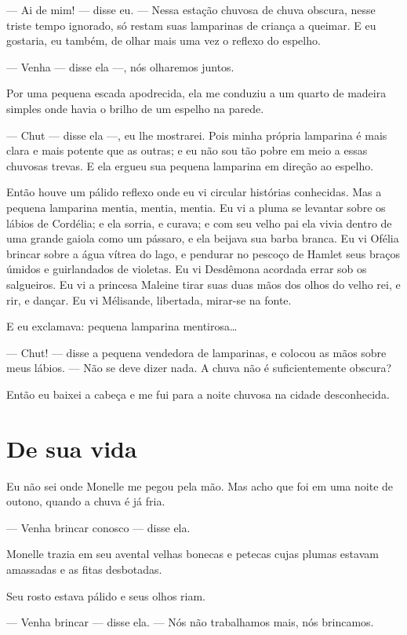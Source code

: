 --- Ai de mim! --- disse eu. --- Nessa estação chuvosa de chuva obscura, nesse
triste tempo ignorado, só restam suas lamparinas de criança a queimar. E eu
gostaria, eu também, de olhar mais uma vez o reflexo do espelho.

--- Venha --- disse ela ---, nós olharemos juntos.

Por uma pequena escada apodrecida, ela me \mbox{conduziu} a um quarto de
madeira simples onde havia o brilho de um espelho na parede.

--- Chut --- disse ela ---, eu lhe mostrarei. Pois minha própria lamparina é
mais clara e mais potente que as outras; e eu não sou tão pobre em meio a
essas chuvosas trevas. E ela ergueu sua pequena lamparina em direção ao
espelho.

Então houve um pálido reflexo onde eu vi circular histórias conhecidas.
Mas a pequena lamparina mentia, mentia, mentia. Eu vi a pluma se levantar
sobre os lábios de Cordélia; e ela sorria, e curava; e com seu velho pai
ela vivia dentro de uma grande gaiola como um pássaro, e ela beijava sua
barba branca. Eu vi Ofélia brincar sobre a água vítrea do lago, e pendurar
no pescoço de Hamlet seus braços úmidos e guirlandados de violetas. Eu vi
Desdêmona acordada errar sob os salgueiros. Eu vi a princesa Maleine tirar
suas duas mãos dos olhos do velho rei, e rir, e dançar. Eu vi Mélisande,
libertada, mirar-se na fonte.

E eu exclamava: pequena lamparina mentirosa\ldots{}

--- Chut! --- disse a pequena vendedora de lamparinas, e colocou as mãos
sobre meus lábios.  --- Não se deve dizer nada. A chuva não é suficientemente
obscura?

Então eu baixei a cabeça e me fui para a noite chuvosa na cidade
desconhecida.

\section{De sua vida}

Eu não sei onde Monelle me pegou pela mão. Mas acho que foi em uma
noite de outono, quando a chuva é já fria.

--- Venha brincar conosco --- disse ela.

Monelle trazia em seu avental velhas bonecas e petecas cujas plumas
estavam amassadas e as fitas desbotadas.

Seu rosto estava pálido e seus olhos riam.

--- Venha brincar --- disse ela.  --- Nós não trabalhamos mais, nós brincamos.

